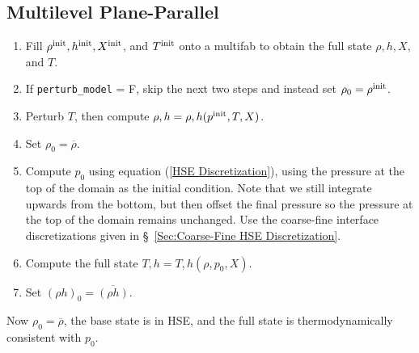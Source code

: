 \documentclass[11pt]{article}
\def\init  {\rm init}
\begin{document}
\subsection{Multilevel Plane-Parallel}
\begin{enumerate}
\item Fill $\rho^{\init}, h^{\init}, X^{\init}$, and $T^{\init}$ onto a multifab to obtain the full state $\rho, h, X$, and $T$.
\item If {\tt perturb\_model} = F, skip the next two steps and instead set $\rho_0 = \rho^{\init}$.
\item Perturb $T$, then compute $\rho,h = \rho,h(p^{\init},T,X)$.
\item Set $\rho_0 = \overline\rho$.
\item Compute $p_0$ using equation (\ref{HSE Discretization}), using the pressure at the top of the domain as the initial condition.  Note that we still integrate upwards from the bottom, but then offset the final pressure so the pressure at the top of the domain remains unchanged.  Use the coarse-fine interface discretizations given in \S~\ref{Sec:Coarse-Fine HSE Discretization}.
\item Compute the full state $T,h = T,h(\rho,p_0,X)$.
\item Set $(\rho h)_0 = \overline{(\rho h)}$.
\end{enumerate}
Now $\rho_0 = \overline\rho$, the base state is in HSE, and the full state is thermodynamically consistent with $p_0$.
\end{document}

